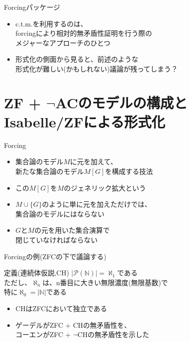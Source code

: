 \documentclass[17pt,aspectratio=169]{beamer}
\begin{document}
\begin{frame} {Forcingパッケージ}
    \begin{itemize}
        \item c.t.m.を利用するのは、\\
              forcingにより相対的無矛盾性証明を行う際の\\
              メジャーなアプローチのひとつ
        \item 形式化の側面から見ると、前述のような\\形式化が難しい{\small (かもしれない)}議論が残ってしまう？
    \end{itemize}
\end{frame}

\section{ZF + $\lnot$ACのモデルの構成とIsabelle/ZFによる形式化}
\begin{frame} {Forcing}
    \begin{itemize}
        \item 集合論のモデル$M$に元を加えて、\\新たな集合論のモデル$M[G]$を構成する技法
        \item この$M[G]$を$M$のジェネリック拡大という
        \item $M \cup \{ G \}$のように単に元を加えただけでは、\\集合論のモデルにはならない
        \item $G$と$M$の元を用いた集合演算で\\閉じていなければならない
    \end{itemize}
\end{frame}

\begin{frame} {Forcingの例{\small (ZFCの下で議論する)}}
    \begin{block}{定義(連続体仮説,CH)}
        $|\mathcal{P}(\mathbb{N})| = \aleph_1$である \\
        ただし、$\aleph_n$は、n番目に大きい無限濃度(無限基数)で\\
        特に$\aleph_0 = |\mathbb{N}|$である
    \end{block}
    \begin{itemize}
        \item CHはZFCにおいて独立である
        \item ゲーデルがZFC + CHの無矛盾性を、\\
              コーエンがZFC + $\neg$CHの無矛盾性を示した
    \end{itemize}
\end{frame}
\end{document}
